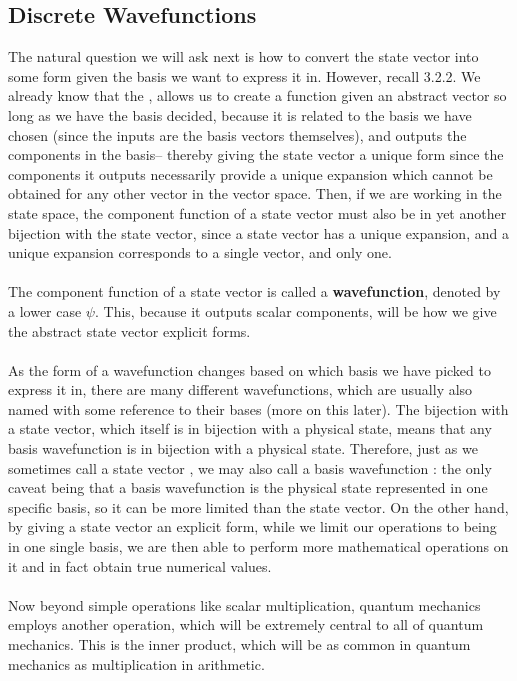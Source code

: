 \subsection{Discrete Wavefunctions}
The natural question we will ask next is how to convert the state vector into some form given the basis we want to  express it in. However, recall 3.2.2. We already know that the , allows us to create a function given an abstract vector so long as we have the basis decided, because it is related to the basis we have chosen (since the inputs are the basis vectors themselves), and outputs the components in the basis-- thereby giving the state vector a unique form since the components it outputs necessarily provide a unique expansion which cannot be obtained for any other vector in the vector space. Then, if we are working in the state space, the component function of a state vector must also be in yet another bijection with the state vector, since a state vector has a unique expansion, and a unique expansion corresponds to a single vector, and only one. 
\\\\
The component function of a state vector is called a \textbf{wavefunction}, denoted by a lower case $\psi$. This, because it outputs scalar components, will be how we give the abstract state vector explicit forms.
\\\\
As the form of a wavefunction changes based on which basis we have picked to express it in, there are many different wavefunctions, which are usually also named with some reference to their bases (more on this later). The bijection with a state vector, which itself is in bijection with a physical state, means that any basis wavefunction is in bijection with a physical state. Therefore, just as we sometimes call a state vector , we may also call a basis wavefunction : the only caveat being that a basis wavefunction is the physical state represented in one specific basis, so it can be more limited than the state vector. On the other hand, by giving a state vector an explicit form, while we limit our operations to being in one single basis, we are then able to perform more mathematical operations on it and in fact obtain true numerical values. 
\\\\
Now beyond simple operations like scalar multiplication, quantum mechanics employs another operation, which will be extremely central to all of quantum mechanics. This is the inner product, which will be as common in quantum mechanics as multiplication in arithmetic.
